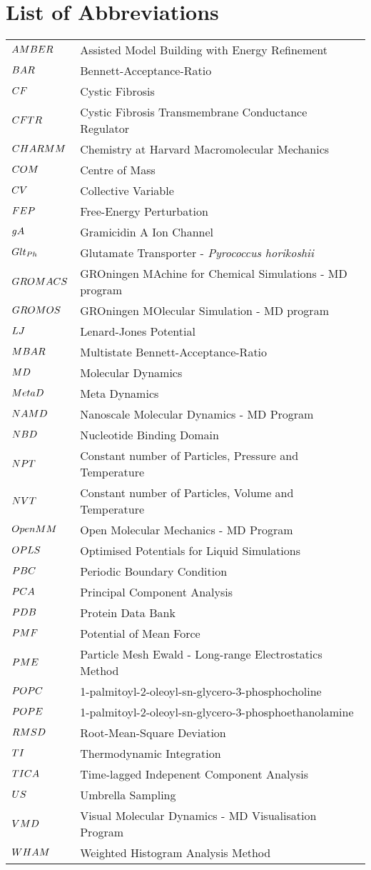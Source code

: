 \chapter*{List of Abbreviations}
\label{chap:abbrev}

\begin{center}
\begin{bfseries}
\vskip 5mm
\newcommand\nomenclature[2]{#1 & #2 \\}
\begin{longtable}{@{}p{3cm}@{}p{\dimexpr\textwidth-1cm\relax}@{}}
\nomenclature{${\small AMBER}$}    {Assisted Model Building with Energy Refinement}
\nomenclature{${\small BAR}$}      {Bennett-Acceptance-Ratio}
\nomenclature{${\small CF}$}        {Cystic Fibrosis}
\nomenclature{${\small CFTR}$}      {Cystic Fibrosis Transmembrane Conductance Regulator}
\nomenclature{${\small CHARMM}$}   {Chemistry at Harvard Macromolecular Mechanics}
\nomenclature{${\small COM}$}      {Centre of Mass}
\nomenclature{${\small CV}$}       {Collective Variable}
\nomenclature{${\small FEP}$}      {Free-Energy Perturbation}
\nomenclature{${\small gA}$}       {Gramicidin A Ion Channel}
\nomenclature{${\small Glt_{Ph}}$} {Glutamate Transporter - \textit{Pyrococcus horikoshii}}
\nomenclature{${\small GROMACS}$}  {GROningen MAchine for Chemical Simulations - MD program}
\nomenclature{${\small GROMOS}$}   {GROningen MOlecular Simulation - MD program}
\nomenclature{${\small LJ}$}       {Lenard-Jones Potential}
\nomenclature{${\small MBAR}$}     {Multistate Bennett-Acceptance-Ratio}
\nomenclature{${\small MD}$}       {Molecular Dynamics}
\nomenclature{${\small MetaD}$}    {Meta Dynamics}
\nomenclature{${\small NAMD}$}     {Nanoscale Molecular Dynamics - MD Program}
\nomenclature{${\small NBD}$}     {Nucleotide Binding Domain}
\nomenclature{${\small NPT}$}      {Constant number of Particles, Pressure and Temperature}
\nomenclature{${\small NVT}$}      {Constant number of Particles, Volume and Temperature}
\nomenclature{${\small OpenMM}$}   {Open Molecular Mechanics - MD Program}
\nomenclature{${\small OPLS}$}     {Optimised Potentials for Liquid Simulations}
\nomenclature{${\small PBC}$}      {Periodic Boundary Condition}
\nomenclature{${\small PCA}$}      {Principal Component Analysis}
\nomenclature{${\small PDB}$}      {Protein Data Bank}
\nomenclature{${\small PMF}$}      {Potential of Mean Force}
\nomenclature{${\small PME}$}      {Particle Mesh Ewald - Long-range Electrostatics Method}
\nomenclature{${\small POPC}$}     {1-palmitoyl-2-oleoyl-sn-glycero-3-phosphocholine}
\nomenclature{${\small POPE}$}     {1-palmitoyl-2-oleoyl-sn-glycero-3-phosphoethanolamine}
\nomenclature{${\small RMSD}$}     {Root-Mean-Square Deviation}
\nomenclature{${\small TI}$}       {Thermodynamic Integration}
\nomenclature{${\small TICA}$}     {Time-lagged Indepenent Component Analysis}
\nomenclature{${\small US}$}       {Umbrella Sampling}
\nomenclature{${\small VMD}$}      {Visual Molecular Dynamics - MD Visualisation Program}
\nomenclature{${\small WHAM}$}     {Weighted Histogram Analysis Method}
\end{longtable}
\end{bfseries}
\end{center}

